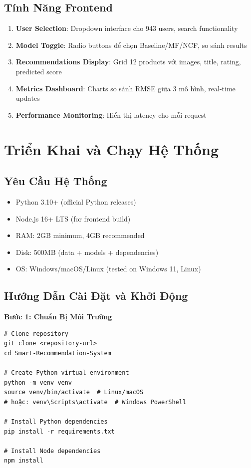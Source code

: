\documentclass[12pt,a4paper]{article}
\begin{document}
\subsection{Tính Năng Frontend}

\begin{enumerate}
    \item \textbf{User Selection}: Dropdown interface cho 943 users, search functionality
    \item \textbf{Model Toggle}: Radio buttons để chọn Baseline/MF/NCF, so sánh results
    \item \textbf{Recommendations Display}: Grid 12 products với images, title, rating, predicted score
    \item \textbf{Metrics Dashboard}: Charts so sánh RMSE giữa 3 mô hình, real-time updates
    \item \textbf{Performance Monitoring}: Hiển thị latency cho mỗi request
\end{enumerate}

\section{Triển Khai và Chạy Hệ Thống}

\subsection{Yêu Cầu Hệ Thống}

\begin{itemize}
    \item Python 3.10+ (official Python releases)
    \item Node.js 16+ LTS (for frontend build)
    \item RAM: 2GB minimum, 4GB recommended
    \item Disk: 500MB (data + models + dependencies)
    \item OS: Windows/macOS/Linux (tested on Windows 11, Linux)
\end{itemize}

\subsection{Hướng Dẫn Cài Đặt và Khởi Động}

\textbf{Bước 1: Chuẩn Bị Môi Trường}
\begin{lstlisting}
# Clone repository
git clone <repository-url>
cd Smart-Recommendation-System

# Create Python virtual environment
python -m venv venv
source venv/bin/activate  # Linux/macOS
# hoặc: venv\Scripts\activate  # Windows PowerShell

# Install Python dependencies
pip install -r requirements.txt

# Install Node dependencies
npm install
\end{lstlisting}
\end{document}
